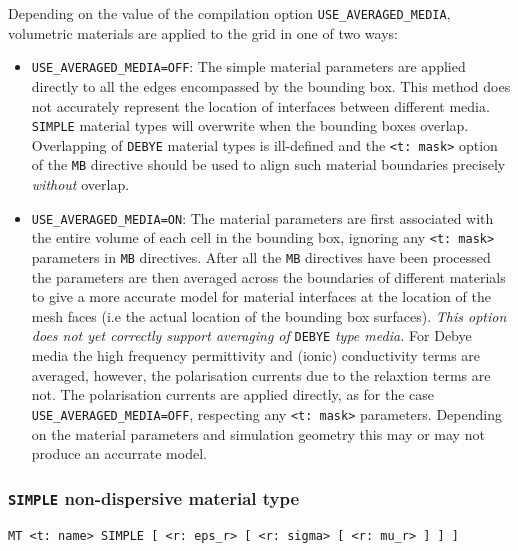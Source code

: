 \documentclass[onecolumn,a4paper]{article}
\numberwithin{equation}{section}
\begin{document}
Depending on the value of the compilation option \texttt{USE\_AVERAGED\_MEDIA}, volumetric materials 
are applied  to the grid in one of two ways:
\begin{itemize}
 \item \texttt{USE\_AVERAGED\_MEDIA=OFF}: The simple material parameters are applied directly to
 all the edges encompassed by the bounding box. This method does not accurately represent the location of 
 interfaces between different media. \texttt{SIMPLE} material types will overwrite when the bounding boxes
 overlap. Overlapping of \texttt{DEBYE} material types is ill-defined and the \texttt{<t:~mask>} option of 
 the \texttt{MB} directive should be used to align such material boundaries precisely {\em without} overlap.
 \item \texttt{USE\_AVERAGED\_MEDIA=ON}: The material parameters are first associated with the entire volume of 
 each cell in  the bounding box, ignoring any \texttt{<t:~mask>} parameters in \texttt{MB} directives. After 
 all the \texttt{MB} directives have been processed the parameters are then 
 averaged across the boundaries of different materials to give a more accurate model for material interfaces
 at the location of the mesh faces (i.e the actual location of the bounding box surfaces). {\em This option does not
 yet correctly support averaging of} \texttt{DEBYE} {\em type media.} For Debye media the high frequency 
 permittivity and (ionic) conductivity terms are averaged, however, the polarisation currents due to the 
 relaxtion terms are not. The polarisation currents are applied directly, as for the case \texttt{USE\_AVERAGED\_MEDIA=OFF},
 respecting any \texttt{<t:~mask>} parameters. Depending on the material parameters and simulation
 geometry this may or may not produce an accurrate model. 
\end{itemize}

\subsubsection{\texttt{SIMPLE} non-dispersive material type}

\begin{verbatim}
MT <t: name> SIMPLE [ <r: eps_r> [ <r: sigma> [ <r: mu_r> ] ] ]
\end{verbatim}
\end{document}
